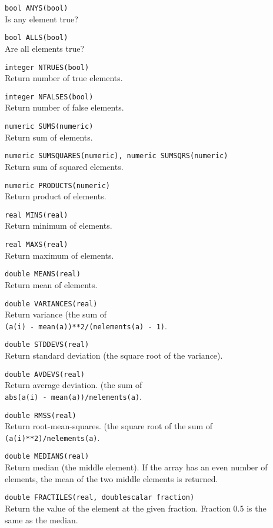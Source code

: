 \begin{description}
  \item[] \texttt{bool ANYS(bool)}\\
    Is any element true?
  \item[] \texttt{bool ALLS(bool)}\\
    Are all elements true?
  \item[] \texttt{integer NTRUES(bool)}\\
    Return number of true elements.
  \item[] \texttt{integer NFALSES(bool)}\\
    Return number of false elements.
  \item[] \texttt{numeric SUMS(numeric)}\\
    Return sum of elements.
  \item[] \texttt{numeric SUMSQUARES(numeric), numeric SUMSQRS(numeric)}\\
    Return sum of squared elements.
  \item[] \texttt{numeric PRODUCTS(numeric)}\\
    Return product of elements.
  \item[] \texttt{real MINS(real)}\\
    Return minimum of elements.
  \item[] \texttt{real MAXS(real)}\\
    Return maximum of elements.
  \item[] \texttt{double MEANS(real)}\\
    Return mean of elements.
  \item[] \texttt{double VARIANCES(real)}\\
    Return variance (the sum of
    \\\texttt{(a(i) - mean(a))**2/(nelements(a) - 1)}.
  \item[] \texttt{double STDDEVS(real)}\\
    Return standard deviation (the square root of the variance).
  \item[] \texttt{double AVDEVS(real)}\\
    Return average deviation. (the sum of 
    \\\texttt{abs(a(i) - mean(a))/nelements(a)}.
  \item[] \texttt{double RMSS(real)}\\
    Return root-mean-squares. (the square root of the sum of
    \\\texttt{(a(i)**2)/nelements(a)}.
  \item[] \texttt{double MEDIANS(real)}\\
    Return median (the middle element).
    If the array has an even number of elements, the mean of
    the two middle elements is returned.
  \item[] \texttt{double FRACTILES(real, doublescalar fraction)}\\
    Return the value of the element at the given fraction.
    Fraction 0.5 is the same as the median.
\end{description}

